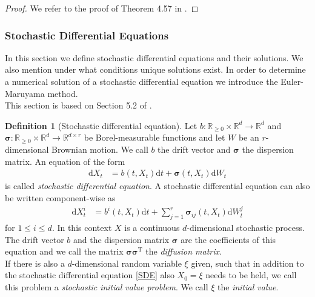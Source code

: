 \documentclass[11pt,titlepage]{article}
\newcommand{\R}{\mathbb{R}} %
\theoremstyle{definition}
\newtheorem{definition}[theorem]{Definition}
\theoremstyle{remark}
\begin{document}
	\begin{proof}
		We refer to the proof of Theorem 4.57 in \cite{Jacod2003}.
	\end{proof}

	\subsubsection{Stochastic Differential Equations}
	
	In this section we define stochastic differential equations and their solutions. We also mention 
	under what conditions unique solutions exist. In order to determine a numerical solution 
	of a stochastic differential equation we introduce the Euler-Maruyama method.\\

	This section is based on Section 5.2 of \cite{Karatzas2012}.
	
	\begin{definition}[Stochastic differential equation]\label{Def SDE}
		Let $b:\R_{\geq 0} \times \R^d \to \R^d$ and $\boldsymbol{\sigma}:\R_{\geq 0} \times \R^d\to\R^{d\times r}$ 
		be Borel-measurable functions and let $W$ be an $r$-dimensional Brownian motion. We call $b$ the drift vector and $\boldsymbol{\sigma}$ the 
		dispersion matrix. An equation of the form
		\begin{align}
			\mathrm{d}X_t &= b(t, X_t)\mathrm{d}t + \boldsymbol{\sigma}(t, X_t)\mathrm{d}W_t \label{SDE}
		\end{align}
		is called \textsl{stochastic differential equation}. A stochastic differential equation can also be written component-wise as
		\begin{align*}
			\mathrm{d}X^i_t &= b^i(t, X_t)\mathrm{d}t + \sum_{j=1}^r \boldsymbol{\sigma}_{ij}(t, X_t)\mathrm{d}W^j_t
		\end{align*}
		for $1\leq i \leq d$. In this context $X$ is a continuous $d$-dimensional stochastic process. %
		The drift vector $b$ and the dispersion matrix $\boldsymbol{\sigma}$ are 
		the coefficients of this equation and we call the matrix $\boldsymbol{\sigma}\boldsymbol{\sigma}^{\mathrm{T}}$ the \textsl{diffusion matrix}.\\
		If there is also a $d$-dimensional random variable $\xi$ given, such that in 
		addition to the stochastic differential equation \ref{SDE} also $X_0 = \xi$ needs 
		to be held, we call this problem a \textsl{stochastic initial value problem}. We call $\xi$ 
		the \textsl{initial value}.
	\end{definition}
	
\end{document}
